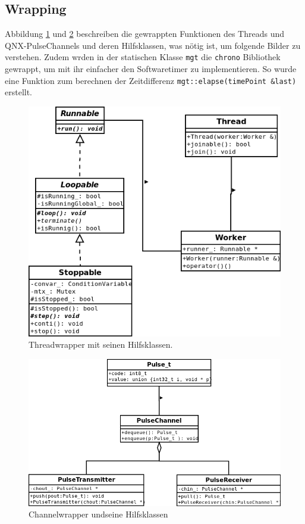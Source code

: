 \documentclass[
   draft=false
  ,paper=a4
  ,twoside=true
  ,fontsize=11pt
  ,headsepline
  ,DIV11
  ,parskip=full+
]{scrartcl} %
\begin{document}
\subsection{Wrapping}
Abbildung \ref{fig:thread} und \ref{fig:channel} beschreiben die gewrappten
Funktionen des Threads und QNX-PulseChannels und deren Hilfsklassen, was nötig ist, um folgende Bilder zu verstehen.
Zudem wrden in der statischen Klasse \texttt{mgt} die \texttt{chrono} Bibliothek gewrappt, um mit ihr einfacher den Softwaretimer zu implementieren.
So wurde eine Funktion zum berechnen der Zeitdifferenz \texttt{mgt::elapse(timePoint \&last)} erstellt.   
\begin{figure}[htp]
  	\centering
    \includegraphics[width=\textwidth]{./IMG/thread.png}
    \caption[thread-uml]{Threadwrapper mit seinen Hilfsklassen.}
     \label{fig:thread}
\end{figure}

\begin{figure}[htp]
  	\centering
    \includegraphics[width=\textwidth]{./IMG/channel.png}
    \caption[channel-uml]{Channelwrapper undseine Hilfsklassen}
     \label{fig:channel}
\end{figure}
\end{document}
